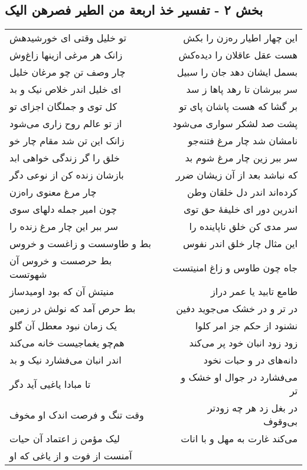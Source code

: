 \begin{center}
\section*{بخش ۲ - تفسیر خذ اربعة من الطیر فصرهن الیک}
\label{sec:sh002}
\begin{longtable}{l p{0.5cm} r}
تو خلیل وقتی ای خورشیدهش
&&
این چهار اطیار ره‌زن را بکش
\\
زانک هر مرغی ازینها زاغ‌وش
&&
هست عقل عاقلان را دیده‌کش
\\
چار وصف تن چو مرغان خلیل
&&
بسمل ایشان دهد جان را سبیل
\\
ای خلیل اندر خلاص نیک و بد
&&
سر ببرشان تا رهد پاها ز سد
\\
کل توی و جملگان اجزای تو
&&
بر گشا که هست پاشان پای تو
\\
از تو عالم روح زاری می‌شود
&&
پشت صد لشکر سواری می‌شود
\\
زانک این تن شد مقام چار خو
&&
نامشان شد چار مرغ فتنه‌جو
\\
خلق را گر زندگی خواهی ابد
&&
سر ببر زین چار مرغ شوم بد
\\
بازشان زنده کن از نوعی دگر
&&
که نباشد بعد از آن زیشان ضرر
\\
چار مرغ معنوی راه‌زن
&&
کرده‌اند اندر دل خلقان وطن
\\
چون امیر جمله دلهای سوی
&&
اندرین دور ای خلیفهٔ حق توی
\\
سر ببر این چار مرغ زنده را
&&
سر مدی کن خلق ناپاینده را
\\
بط و طاوسست و زاغست و خروس
&&
این مثال چار خلق اندر نفوس
\\
بط حرصست و خروس آن شهوتست
&&
جاه چون طاوس و زاغ امنیتست
\\
منیتش آن که بود اومیدساز
&&
طامع تابید یا عمر دراز
\\
بط حرص آمد که نولش در زمین
&&
در تر و در خشک می‌جوید دفین
\\
یک زمان نبود معطل آن گلو
&&
نشنود از حکم جز امر کلوا
\\
هم‌چو یغماجیست خانه می‌کند
&&
زود زود انبان خود پر می‌کند
\\
اندر انبان می‌فشارد نیک و بد
&&
دانه‌های در و حبات نخود
\\
تا مبادا یاغیی آید دگر
&&
می‌فشارد در جوال او خشک و تر
\\
وقت تنگ و فرصت اندک او مخوف
&&
در بغل زد هر چه زودتر بی‌وقوف
\\
لیک مؤمن ز اعتماد آن حیات
&&
می‌کند غارت به مهل و با انات
\\
آمنست از فوت و از یاغی که او

\end{longtable}
\end{center}
